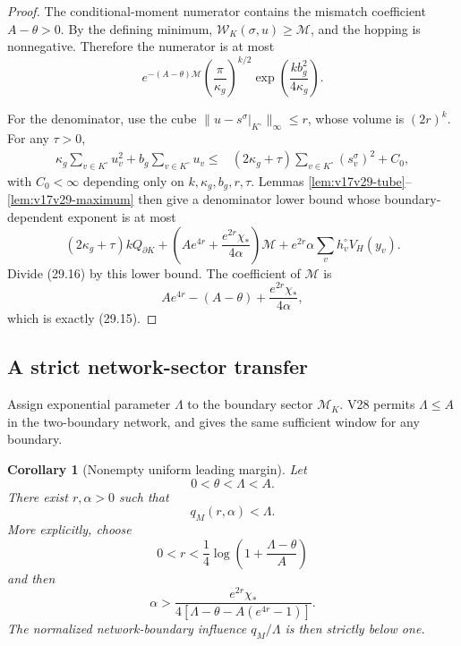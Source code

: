 \documentclass[11pt]{article}
\newtheorem{corollary}[theorem]{Corollary}
\theoremstyle{remark}
\begin{document}
\begin{proof}
The conditional-moment numerator contains the mismatch coefficient
\(A-\theta>0\).  By the defining minimum,
\(\mathcal W_K(\sigma,u)\geq\mathcal M\), and the hopping is
nonnegative.  Therefore the numerator is at most
\[
 e^{-(A-\theta)\mathcal M}
 \left(\frac{\pi}{\kappa_g}\right)^{k/2}
 \exp\left(\frac{kb_g^2}{4\kappa_g}\right).       \tag{29.16}
\]

For the denominator, use the cube
\(\|u-s^\sigma|_{K^\circ}\|_\infty\leq r\), whose volume is
\((2r)^k\).  For any \(\tau>0\),
\[
\begin{aligned}
 \kappa_g\sum_{v\in K^\circ}u_v^2
 +b_g\sum_{v\in K^\circ}u_v
 \leq{}&(2\kappa_g+\tau)
 \sum_{v\in K^\circ}(s_v^\sigma)^2+C_0,          \tag{29.17}
\end{aligned}
\]
with \(C_0<\infty\) depending only on
\(k,\kappa_g,b_g,r,\tau\).  Lemmas
\ref{lem:v17v29-tube}--\ref{lem:v17v29-maximum} then give a denominator
lower bound whose boundary-dependent exponent is at most
\[
 (2\kappa_g+\tau)kQ_{\partial K}
 +\left(Ae^{4r}+\frac{e^{2r}\chi_*}{4\alpha}\right)\mathcal M
 +e^{2r}\alpha\sum_vh_v^\circ V_H(y_v).           \tag{29.18}
\]
Divide (29.16) by this lower bound.  The coefficient of
\(\mathcal M\) is
\[
 Ae^{4r}-(A-\theta)
 +\frac{e^{2r}\chi_*}{4\alpha},                   \tag{29.19}
\]
which is exactly (29.15).
\end{proof}

\subsection{A strict network-sector transfer}

Assign exponential parameter \(\Lambda\) to the boundary sector
\(\mathcal M_K\).  V28 permits \(\Lambda\leq A\) in the two-boundary
network, and gives the same sufficient window for any boundary.

\begin{corollary}[Nonempty uniform leading margin]
\label{cor:v17v29-margin}
Let
\[
 0<\theta<\Lambda<A.                               \tag{29.20}
\]
There exist \(r,\alpha>0\) such that
\[
 q_M(r,\alpha)<\Lambda.                            \tag{29.21}
\]
More explicitly, choose
\[
 0<r<\frac14\log\left(1+\frac{\Lambda-\theta}{A}\right)       \tag{29.22}
\]
and then
\[
 \alpha>
 \frac{e^{2r}\chi_*}
 {4\left[\Lambda-\theta-A(e^{4r}-1)\right]}.       \tag{29.23}
\]
The normalized network-boundary influence
\(q_M/\Lambda\) is then strictly below one.
\end{corollary}
\end{document}

